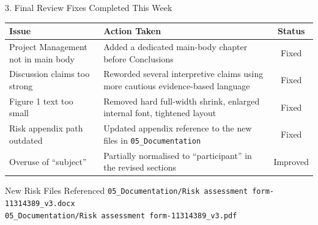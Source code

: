 \documentclass[aspectratio=169, 11pt]{beamer}
\begin{document}
\begin{frame}[shrink=8]{3. Final Review Fixes Completed This Week}

    \begin{table}
        \centering
        \small
        \begin{tabular}{p{4.0cm}p{6.0cm}c}
            \toprule
            \textbf{Issue} & \textbf{Action Taken} & \textbf{Status} \\
            \midrule
            Project Management not in main body
            & Added a dedicated main-body chapter before Conclusions
            & \textcolor{completed}{Fixed} \\
            Discussion claims too strong
            & Reworded several interpretive claims using more cautious evidence-based language
            & \textcolor{completed}{Fixed} \\
            Figure 1 text too small
            & Removed hard full-width shrink, enlarged internal font, tightened layout
            & \textcolor{completed}{Fixed} \\
            Risk appendix path outdated
            & Updated appendix reference to the new files in \texttt{05\_Documentation}
            & \textcolor{completed}{Fixed} \\
            Overuse of ``subject''
            & Partially normalised to ``participant'' in the revised sections
            & \textcolor{inprogress}{Improved} \\
            \bottomrule
        \end{tabular}
    \end{table}

    \vspace{2mm}
    \begin{exampleblock}{New Risk Files Referenced}
        \texttt{05\_Documentation/Risk assessment form-11314389\_v3.docx}\\
        \texttt{05\_Documentation/Risk assessment form-11314389\_v3.pdf}
    \end{exampleblock}
\end{frame}
\end{document}

